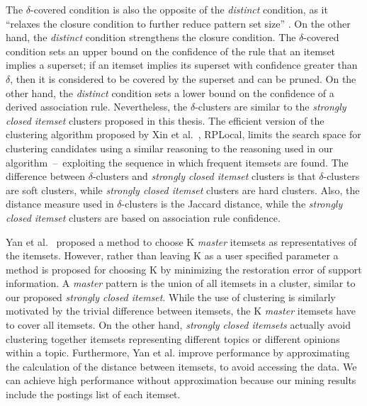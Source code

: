 \documentclass[letterpaper,12pt,titlepage,oneside,final]{book}
\begin{document}
The $\delta$-covered condition is also the opposite of the \emph{distinct}
condition, as it ``relaxes the closure condition to further reduce pattern
set size'' \cite{liu2012finding}. On the other hand, the \emph{distinct}  condition strengthens the closure condition.
The $\delta$-covered condition sets an upper bound on the confidence of the rule that 
an itemset implies a superset; 
if an itemset implies its superset with confidence greater than $\delta$, 
then it is considered to be covered by the superset and can be pruned.
On the other hand, the \emph{distinct} condition
sets a lower bound on the confidence of a derived association rule.
Nevertheless, the $\delta$-clusters are similar to the \emph{strongly closed
itemset} clusters proposed in this thesis. 
The efficient version of the clustering algorithm proposed by Xin et al.~\cite{xin2005mining}, RPLocal, 
limits the search space for clustering candidates using a similar reasoning to 
the reasoning used in our algorithm~--~exploiting the sequence in which frequent itemsets are found.
The difference between $\delta$-clusters and \emph{strongly closed itemset} clusters
is that $\delta$-clusters are soft clusters, while \emph{strongly closed itemset} clusters
are hard clusters. 
Also, the distance measure used in $\delta$-clusters is the Jaccard distance,
while the \emph{strongly closed itemset} clusters are based on association rule confidence.

Yan et al.~\cite{yan2005summarizing} proposed a method to choose K \emph{master} itemsets as representatives of the itemsets. 
However, rather than leaving K as a user specified parameter
a method is proposed for choosing K by minimizing the restoration error of support information. %
A \emph{master} pattern is the union of all itemsets in a cluster, similar to our proposed \emph{strongly closed itemset}. 
While the use of clustering is similarly motivated by the trivial difference between itemsets, the K \emph{master} itemsets  have to cover all itemsets.  
On the other hand,  \emph{strongly closed itemsets}  actually avoid clustering together itemsets representing different topics or different opinions within a topic.
Furthermore, Yan et al. improve performance by approximating the calculation of the distance between itemsets, to avoid accessing the data. 
We can achieve high performance without approximation because our mining results include the postings list of each itemset. 
\end{document}
